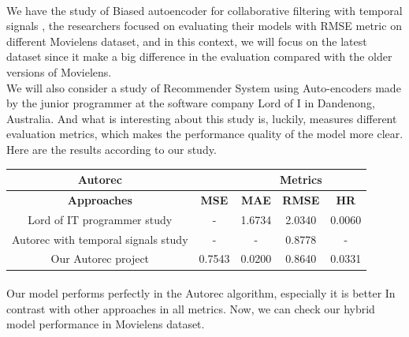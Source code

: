\documentclass{cup-pan}
\begin{document}
\paragraph{}
We have the study of Biased autoencoder for collaborative filtering with temporal signals \cite{11}, the researchers focused on evaluating their models with RMSE metric on different Movielens dataset, and in this context, we will focus on the latest dataset since it make a big difference in the evaluation compared with the older versions of Movielens.
\\
We will also consider a study of Recommender System using Auto-encoders \cite{24} made by the junior programmer at the software company Lord of I in Dandenong, Australia. And what is interesting about this study is, luckily, measures different evaluation metrics, which makes the performance quality of the model more clear. Here are the results according to our study.

\begin{center} 
  \begin{tabular}{||c||c|c|c|c||}
    \hline\hline 
    \textbf{Autorec} & \multicolumn{1}{c}{\textbf{}} & \multicolumn{3}{c||}{\hspace{-1.5cm}\textbf{Metrics}} \\
    \hline\hline 
    \multicolumn{1}{||c||}{\textbf{Approaches}} & \textbf{MSE} & \textbf{MAE} & \textbf{RMSE} & \textbf{HR} \\
    \hline 
    Lord of IT programmer study & - & 1.6734 & 2.0340 & 0.0060 \\
    Autorec with temporal signals study & - & - & 0.8778  & - \\
    Our Autorec project & 0.7543 & 0.0200 & 0.8640 & 0.0331 \\
    \hline\hline
  \end{tabular}
\end{center}

\paragraph{}
Our model performs perfectly in the Autorec algorithm, especially it is better In contrast with other approaches in all metrics. Now, we can check our hybrid model performance in Movielens dataset.
\end{document}

